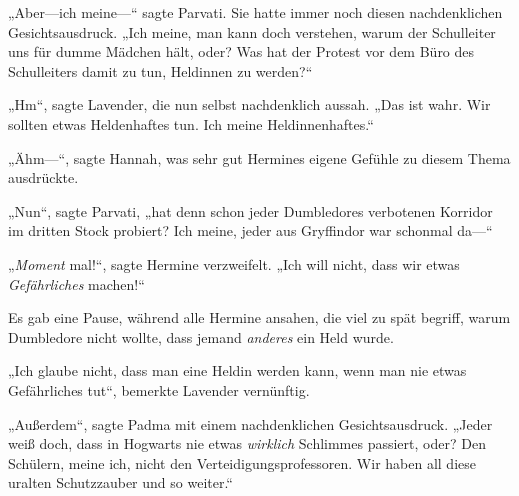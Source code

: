 „Aber—ich meine—“ sagte Parvati. Sie hatte immer noch diesen nachdenklichen Gesichtsausdruck. „Ich meine, man kann doch verstehen, warum der Schulleiter uns für dumme Mädchen hält, oder? Was hat der Protest vor dem Büro des Schulleiters damit zu tun, Heldinnen zu werden?“

„Hm“, sagte Lavender, die nun selbst nachdenklich aussah. „Das ist wahr. Wir sollten etwas Heldenhaftes tun. Ich meine Heldinnenhaftes.“

„Ähm—“, sagte Hannah, was sehr gut Hermines eigene Gefühle zu diesem Thema ausdrückte.

„Nun“, sagte Parvati, „hat denn schon jeder Dumbledores verbotenen Korridor im dritten Stock probiert? Ich meine, jeder aus Gryffindor war schonmal da—“

„\emph{Moment} mal!“, sagte Hermine verzweifelt. „Ich will nicht, dass wir etwas \emph{Gefährliches} machen!“

Es gab eine Pause, während alle Hermine ansahen, die viel zu spät begriff, warum Dumbledore nicht wollte, dass jemand \emph{anderes} ein Held wurde.

„Ich glaube nicht, dass man eine Heldin werden kann, wenn man nie etwas Gefährliches tut“, bemerkte Lavender vernünftig.

„Außerdem“, sagte Padma mit einem nachdenklichen Gesichtsausdruck. „Jeder weiß doch, dass in Hogwarts nie etwas \emph{wirklich} Schlimmes passiert, oder? Den Schülern, meine ich, nicht den Verteidigungsprofessoren. Wir haben all diese uralten Schutzzauber und so weiter.“

